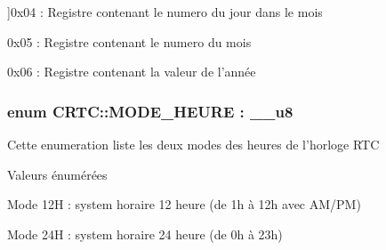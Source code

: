 \begin{Desc}
\begin{description}
{}]0x04 \+: Registre contenant le numero du jour dans le mois \item[{\em 
\hypertarget{classCRTC_adf700236f14a2071204dc36a75cf4890a2256ab3ce73e9b0ee693d8c78cefe7a1}{M\+O\+I\+S}\label{classCRTC_adf700236f14a2071204dc36a75cf4890a2256ab3ce73e9b0ee693d8c78cefe7a1}
}]0x05 \+: Registre contenant le numero du mois \item[{\em 
\hypertarget{classCRTC_adf700236f14a2071204dc36a75cf4890a183bf954a3bf4d6fef2515152358aca8}{A\+N\+N\+E\+E}\label{classCRTC_adf700236f14a2071204dc36a75cf4890a183bf954a3bf4d6fef2515152358aca8}
}]0x06 \+: Registre contenant la valeur de l'année \end{description}
\end{Desc}
\hypertarget{classCRTC_a5b756d38b71f30430a0d4dee80c935a2}{
\subsubsection[{M\+O\+D\+E\+\_\+\+H\+E\+U\+R\+E}]{\setlength{\rightskip}{0pt plus 5cm}enum {\bf C\+R\+T\+C\+::\+M\+O\+D\+E\+\_\+\+H\+E\+U\+R\+E} \+: \+\_\+\+\_\+u8\hspace{0.3cm}{\ttfamily [strong]}}}\label{classCRTC_a5b756d38b71f30430a0d4dee80c935a2}
Cette enumeration liste les deux modes des heures de l'horloge R\+T\+C \begin{Desc}
\item[Valeurs énumérées]\par
\begin{description}
\item[{\em 
\hypertarget{classCRTC_a5b756d38b71f30430a0d4dee80c935a2ac1d9f50f86825a1a2302ec2449c17196}{H}\label{classCRTC_a5b756d38b71f30430a0d4dee80c935a2ac1d9f50f86825a1a2302ec2449c17196}
}]Mode 12\+H \+: system horaire 12 heure (de 1h à 12h avec A\+M/\+P\+M) \item[{\em 
\hypertarget{classCRTC_a5b756d38b71f30430a0d4dee80c935a2ac1d9f50f86825a1a2302ec2449c17196}{H}\label{classCRTC_a5b756d38b71f30430a0d4dee80c935a2ac1d9f50f86825a1a2302ec2449c17196}
}]Mode 24\+H \+: system horaire 24 heure (de 0h à 23h) \end{description}
\end{Desc}
